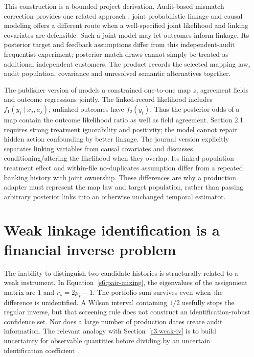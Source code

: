 This construction is a bounded project derivation. Audit-based mismatch
correction provides one related approach \citep{slawski2025}; joint
probabilistic linkage and causal modeling offers a different route
\citep{guha2022} when a
well-specified joint likelihood and linking covariates are defensible. Such
a joint model may let outcomes inform linkage. Its posterior target and
feedback assumptions differ from this independent-audit frequentist
experiment; posterior match draws cannot simply be treated as additional
independent customers. The product records the selected mapping law, audit
population, covariance and unresolved semantic alternatives together.


The publisher version of \citet[Section 2.3, equation (2.4)]{guha2022}
models a constrained one-to-one map $z$, agreement fields and outcome
regressions jointly. The linked-record likelihood includes
$f_1(y_i\mid x_j,a_j)$; unlinked outcomes have $f_2(y_i)$. Thus the
posterior odds of a map contain the outcome likelihood ratio as well as
field agreement. Section 2.1 requires strong treatment ignorability and
positivity; the model cannot repair hidden action confounding by better
linkage. The journal version explicitly separates linking variables from
causal covariates and discusses conditioning/altering the likelihood when
they overlap. Its linked-population treatment effect and within-file
no-duplicates assumption differ from a repeated banking history with
joint ownership. These differences are why a production adapter must
represent the map law and target population, rather than passing arbitrary
posterior links into an otherwise unchanged temporal estimator.


\section{Weak linkage identification is a financial inverse problem}
\label{s61:linkage-sets}
The inability to distinguish two candidate histories is structurally related
to a weak instrument. In Equation~\eqref{s6:pair-mixing}, the eigenvalues of
the assignment matrix are $1$ and $r_s=2p_s-1$. The portfolio sum survives
even when the difference is unidentified. A Wilson interval containing
$1/2$ usefully stops the regular inverse, but that screening rule does not
construct an identification-robust confidence set. Nor does a large number
of production dates create audit information. The relevant analogy with
Section~\ref{r3:weak-iv} is to build uncertainty for observable quantities
before dividing by an uncertain identification coefficient
\citep[Section 2D, Theorem 3]{staiger1994}.

